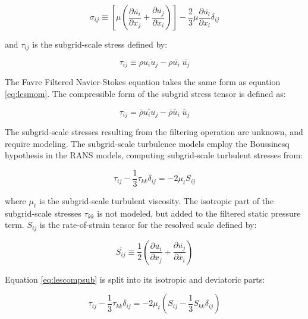 \begin{equation} \label{eq:lesstress}
\sigma_{ij}
\equiv
\left[ \mu \left( \frac{\partial \overline{u_i}}{\partial x_{j}} + \frac{\partial \overline{u_j}}{\partial x_{i}} \right) \right]
- \frac{2}{3} \mu \frac{\partial \overline{u_l}}{\partial x_l} \delta_{ij}
\end{equation}

\noindent and $\tau_{ij}$ is the subgrid-scale stress defined by:

\begin{equation} \label{eq:lessubstress}
\tau_{ij} \equiv \rho \overline{u_i u_j} - \rho \overline{u_i} \; \overline{u_j}
\end{equation}

The Favre Filtered Navier-Stokes equation takes the same form as equation \ref{eq:lesmom}. The compressible form of the subgrid stress tensor is defined as:

\begin{equation} \label{eq:lescompsub}
\tau_{ij} = \overline{\rho} \tilde{u_i u_j} - \overline{\rho} \tilde{u_i} \; \tilde{u_j}
\end{equation}

The subgrid-scale stresses resulting from the filtering operation are unknown, and require modeling. The subgrid-scale turbulence models employ the Boussinesq hypothesis \citep{bousinesque} in the RANS models, computing subgrid-scale turbulent stresses from:

\begin{equation} \label{eq:lesturbstress}
\tau_{ij} - \frac{1}{3} \tau_{kk} \delta_{ij} = -2 \mu_{t} \overline{S_{ij}}
\end{equation}

\noindent where $\mu_t$ is the subgrid-scale turbulent viscosity. The isotropic part of the subgrid-scale stresses $\tau_{kk}$ is not modeled, but added to the filtered static pressure term. $S_{ij}$ is the rate-of-strain tensor for the resolved scale defined by:

\begin{equation} \label{eq:lesstrain}
\overline{S_{ij}} \equiv \frac{1}{2} \left( \frac{\partial \overline{u_i}}{\partial x_j} + \frac{\partial \overline{u_j}}{\partial x_i} \right)
\end{equation}

Equation \ref{eq:lescompsub} is split into its isotropic and deviatoric parts:

\begin{equation} \label{eq:lesdeviatoric}
\tau_{ij} - \frac{1}{3} \tau_{kk} \delta_{ij} = -2 \mu_{t} \left( S_{ij} - \frac{1}{3} S_{kk} \delta_{ij} \right)
\end{equation}

